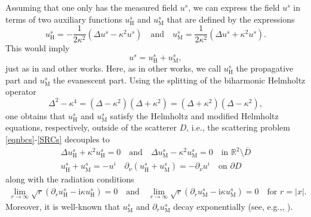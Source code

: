 \documentclass{article}
\begin{document}
Assuming that one only has the measured field $u^s$, we can express the field $u^s$ in terms of two auxiliary functions $u_{\mathrm H}^s$ and $u_{\mathrm M}^s$ that are defined by the expressions
\begin{equation}\label{aux_components}
    u_{\mathrm H}^s=-\frac{1}{2\kappa^2}(\Delta u^s-\kappa^2u^s)\quad \text{and}\quad u_{\mathrm M}^s=\frac{1}{2\kappa^2}(\Delta u^s+\kappa^2u^s).
\end{equation}
This would imply
\[
u^s=u_{\mathrm H}^s+u_{\mathrm M}^s,
\]
just as in \cite{HarrisLiOzochiawaeze2026} and other works. Here, as in other works, we call $u_{\mathrm H}^s$ the propagative part and $u_{\mathrm M}^s$ the evanescent part. Using the splitting of the biharmonic Helmholtz operator
\[
\Delta^2-\kappa^4=(\Delta-\kappa^2)(\Delta+\kappa^2)=(\Delta+\kappa^2)(\Delta-\kappa^2),
\]
one obtains that $u_{\mathrm H}^s$ and $u_{\mathrm M}^s$ satisfy the Helmholtz and modified Helmholtz equations, respectively, outside of the scatterer $D$, i.e., the scattering problem \eqref{eqnbcs}-\eqref{SRCs} decouples to 
\begin{align*}%
    \Delta u_{\mathrm H}^s+\kappa^2 u_{\mathrm H}^s=0\quad \text{and}\quad \Delta u_{\mathrm M}^s-\kappa^2 u_{\mathrm M}^s=0\quad \text{in }\mathbb R^2\setminus\overline{D}\\
    u_{\mathrm H}^s+u_{\mathrm M}^s=-u^i\quad \partial_\nu(u_{\mathrm H}^s+u_{\mathrm M}^s)=-\partial_\nu u^i\quad \text{on }\partial D
\end{align*}
along with the radiation conditions
\begin{align}\label{decouple_3}
    \lim_{r\to\infty}\sqrt r(\partial_r u_{\mathrm H}^s-\mathrm i\kappa u_{\mathrm H}^s)=0\quad \text{and}\quad \lim_{r\to\infty}\sqrt r(\partial_r u_{\mathrm M}^s-\mathrm i\kappa u_{\mathrm M}^s)=0\quad \text{for }r=|x|.
\end{align}
Moreover, it is well-known that $u_{\mathrm M}^s$ and $\partial_r u_{\mathrm M}^s$ decay exponentially (see, e.g.,\cite{BourgeoisHazard2020}, \cite{HarrisLeeLi2025}). 
\end{document}
